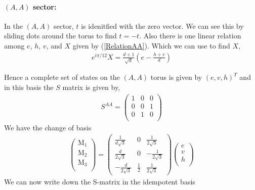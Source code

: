 \documentclass[12pt,a4paper]{article}
\begin{document}
\paragraph{$(A,A)$ sector:}
In the $(A,A)$ sector, $t$ is idenitfied with the zero vector. We can see this by sliding dots around the torus to find $t = -t$.
Also there is one linear relation among $e$, $h$, $v$, and $X$ given by (\ref{RelationAA}).
Which we can use to find $X$,
\begin{align}
e^{i \pi /12} X = \frac{d+1}{\sqrt{d}}(e -\frac{h + v}{d})
\end{align}


Hence a complete set of states on the $(A,A)$ torus is given by $(e, v, h)^{T}$ and in this basis the $S$ matrix is given by,
\begin{align}
S^{AA} = \left(\begin{matrix}
1& 0& 0 \\
0& 0&1  \\
0&1 &0 \\ 
\end{matrix} \right)
\end{align}
We have the change of basis
\begin{align}
\left( \begin{matrix}
\text{M}_1\\
\text{M}_2\\
\text{M}_3\\
\end{matrix} \right)
= \left( \begin{matrix}
\frac{1}{d\sqrt{3}} & 0 & \frac{1}{2 \sqrt{3}} \\
\frac{d}{2 \sqrt{3}} & 0 & - \frac{1}{2 \sqrt{3}} \\
- \frac{d}{2 \sqrt{3}} & \frac{1}{2} & \frac{1}{2 \sqrt{3}}
\end{matrix} \right)
\left( \begin{matrix}
e\\
v\\
h\\
\end{matrix} \right)
\end{align}
We can now write down the S-matrix in the idempotent basis
\end{document}
